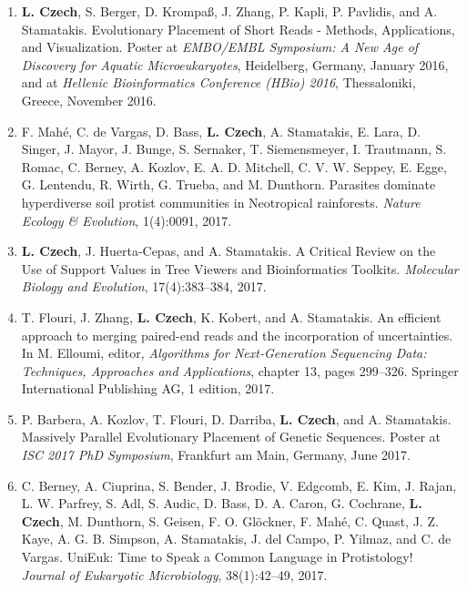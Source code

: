 \begin{enumerate}
    \item \textbf{L. Czech}, S. Berger, D. Krompaß, J. Zhang, P. Kapli, P. Pavlidis, and A. Stamatakis.
        Evolutionary Placement of Short Reads - Methods, Applications, and Visualization.
        Poster at \textit{EMBO/EMBL Symposium: A New Age of Discovery for Aquatic Microeukaryotes}, Heidelberg, Germany, January 2016,
        and at \textit{Hellenic Bioinformatics Conference (HBio) 2016}, Thessaloniki, Greece, November 2016.

    \item F. Mah{\'{e}}, C. de Vargas, D. Bass, \textbf{L. Czech}, A. Stamatakis, E. Lara, D. Singer, J. Mayor, J. Bunge,
        S. Sernaker, T. Siemensmeyer, I. Trautmann, S. Romac, C. Berney, A. Kozlov, E. A. D. Mitchell, C. V. W. Seppey,
        E. Egge, G. Lentendu, R. Wirth, G. Trueba, and M. Dunthorn.
        Parasites dominate hyperdiverse soil protist communities in Neotropical rainforests.
        \textit{Nature Ecology \& Evolution}, 1(4):0091, 2017. \cite{Mahe2017}

    \item \textbf{L. Czech}, J. Huerta-Cepas, and A. Stamatakis.
        A Critical Review on the Use of Support Values in Tree Viewers and Bioinformatics Toolkits.
        \textit{Molecular Biology and Evolution}, 17(4):383--384, 2017. \cite{Czech2017}

    \item T. Flouri, J. Zhang, \textbf{L. Czech}, K. Kobert, and A. Stamatakis.
        An efficient approach to merging paired-end reads and the incorporation of uncertainties.
        In M. Elloumi, editor, \textit{Algorithms for Next-Generation Sequencing Data: Techniques, Approaches and Applications},
        chapter 13, pages 299--326. Springer International Publishing AG, 1 edition, 2017. \cite{Flouri2017}

    \item P. Barbera, A. Kozlov, T. Flouri, D. Darriba, \textbf{L. Czech}, and A. Stamatakis.
        Massively Parallel Evolutionary Placement of Genetic Sequences.
        Poster at \textit{ISC 2017 PhD Symposium}, Frankfurt am Main, Germany, June 2017.

    \item C. Berney, A. Ciuprina, S. Bender, J. Brodie, V. Edgcomb, E. Kim, J. Rajan, L. W. Parfrey, S. Adl, S. Audic,
        D. Bass, D. A. Caron, G. Cochrane, \textbf{L. Czech}, M. Dunthorn, S. Geisen, F. O. Glöckner, F. Mah{\'{e}}, C. Quast,
        J. Z. Kaye, A. G. B. Simpson, A. Stamatakis, J. del Campo, P. Yilmaz, and C. de Vargas.
        UniEuk: Time to Speak a Common Language in Protistology!
        \textit{Journal of Eukaryotic Microbiology}, 38(1):42--49, 2017. \cite{Berney2017}


\end{enumerate}
